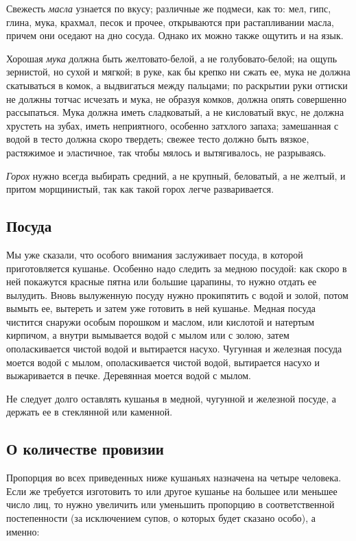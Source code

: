 Свежесть \emph{масла} узнается по вкусу; различные же подмеси, как то: мел, гипс, глина, мука, крахмал, песок и прочее, открываются при растапливании масла, причем они оседают на дно сосуда. Однако их можно также ощутить и на язык.

Хорошая \emph{мука} должна быть желтовато-белой, а не голубовато-белой; на ощупь зернистой, но сухой и мягкой; в руке, как бы крепко ни сжать ее, мука не должна скатываться в комок, а выдвигаться между пальцами; по раскрытии руки оттиски не должны тотчас исчезать и мука, не образуя комков, должна опять совершенно рассыпаться. Мука должна иметь сладковатый, а не кисловатый вкус, не должна хрустеть на зубах, иметь неприятного, особенно затхлого запаха; замешанная с водой в тесто должна скоро твердеть; свежее тесто должно быть вязкое, растяжимое и эластичное, так чтобы мялось и вытягивалось, не разрываясь.

\emph{Горох} нужно всегда выбирать средний, а не крупный, беловатый, а не желтый, и притом морщинистый, так как такой горох легче разваривается.

\subsection{Посуда}

Мы уже сказали, что особого внимания заслуживает посуда, в которой приготовляется кушанье. Особенно надо следить за медною посудой: как скоро в ней покажутся красные пятна или большие царапины, то нужно отдать ее вылудить. Вновь вылуженную посуду нужно прокипятить с водой и золой, потом вымыть ее, вытереть и затем уже готовить в ней кушанье. Медная посуда чистится снаружи особым порошком и маслом, или кислотой и натертым кирпичом, а внутри вымывается водой с мылом или с золою, затем ополаскивается чистой водой и вытирается насухо. Чугунная и железная посуда моется водой с мылом, ополаскивается чистой водой, вытирается насухо и выжаривается в печке. Деревянная моется водой с мылом.

Не следует долго оставлять кушанья в медной, чугунной и железной посуде, а держать ее в стеклянной или каменной.

\subsection{О количестве провизии}

Пропорция во всех приведенных ниже кушаньях назначена на четыре человека. Если же требуется изготовить то или другое кушанье на большее или меньшее число лиц, то нужно увеличить или уменьшить пропорцию в соответственной постепенности (за исключением супов, о которых будет сказано особо), а именно:

